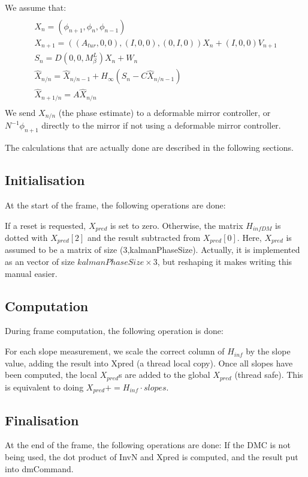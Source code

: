 \documentclass[a4,10pt]{article}
\begin{document}
We assume that:
\begin{multline}\\
X_n=(\phi_{n+1},\phi_{n},\phi_{n-1})\\
X_{n+1} = ((A_{tur}, 0, 0), (I, 0, 0), (0, I, 0)) X_n + (I, 0, 0)
V_{n+1}\\
S_n = D (0, 0, M_\beta^L) X_n + W_n\\
\hat{X}_{n/n} = \hat{X}_{n/n-1} + H_\infty (S_n -C\hat{X}_{n/n-1})\\
\hat{X}_{n+1/n} = A\hat{X}_{n/n}\\
\end{multline}
We send $X_{n/n}$ (the phase estimate) to a deformable mirror
controller, or $N^{-1} \phi_{n+1}$ directly to the mirror if not using
a deformable mirror controller.

The calculations that are actually done are described in the following
sections.  

\subsection{Initialisation}
At the start of the frame, the following operations are done:

If a reset is requested, $X_{pred}$ is set to zero.  Otherwise, the matrix
$H_{infDM}$ is dotted with $X_{pred}[2]$ and the result subtracted from
$X_{pred}[0]$.  Here, $X_{pred}$ is assumed to be a matrix of size
(3,kalmanPhaseSize).  Actually, it is implemented as an vector of size
$kalmanPhaseSize\times 3$, but reshaping it makes writing this manual easier.


\subsection{Computation}
During frame computation, the following operation is done:

For each slope measurement, we scale the correct column of $H_{inf}$ by the
slope value, adding the result into Xpred (a thread local copy).  Once
all slopes have been computed, the local $X_{pred}$s are added to the
global $X_{pred}$ (thread safe).  This is equivalent to doing $X_{pred}+=H_{inf}
\cdot slopes$.  

\subsection{Finalisation}
At the end of the frame, the following operations are done:
If the DMC is not being used, the dot product of InvN and Xpred is
computed, and the result put into dmCommand.
\end{document}
